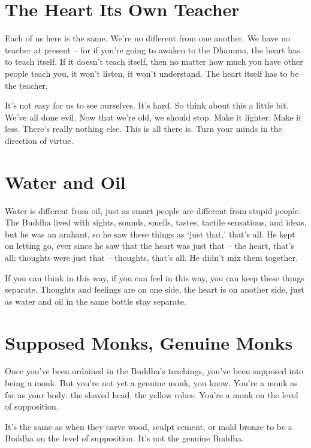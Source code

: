 \clearpage

\section{The Heart Its Own Teacher}

Each of us here is the same. We're no different from one another. We have no teacher at present -- for if you're going to awaken to the Dhamma, the heart has to teach itself. If it doesn't teach itself, then no matter how much you have other people teach you, it won't listen, it won't understand. The heart itself has to be the teacher.

It's not easy for us to see ourselves. It's hard. So think about this a little bit. We've all done evil. Now that we're old, we should stop. Make it lighter. Make it less. There's really nothing else. This is all there is. Turn your minds in the direction of virtue.

\section{Water and Oil}

\enlargethispage{\baselineskip}
Water is different from oil, just as smart people are different from stupid people. The Buddha lived with sights, sounds, smells, tastes, tactile sensations, and ideas, but he was an arahant, so he saw these things as `just that,' that's all. He kept on letting go, ever since he saw that the heart was just that -- the heart, that's all; thoughts were just that -- thoughts, that's all. He didn't mix them together.

If you can think in this way, if you can feel in this way, you can keep these things separate. Thoughts and feelings are on one side, the heart is on another side, just as water and oil in the same bottle stay separate.

\clearpage

\section{Supposed Monks, Genuine Monks}

Once you've been ordained in the Buddha's teachings, you've been supposed into being a monk. But you're not yet a genuine monk, you know. You're a monk as far as your body: the shaved head, the yellow robes. You're a monk on the level of supposition.

It's the same as when they carve wood, sculpt cement, or mold bronze to be a Buddha on the level of supposition. It's not the genuine Buddha. 


